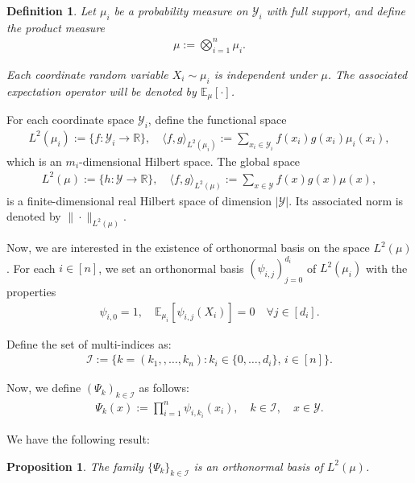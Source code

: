 \documentclass[letterpaper,11pt]{article}
\numberwithin{equation}{section}
\newtheorem{definition}[theorem]{Definition}
\newtheorem{proposition}[theorem]{Proposition}
\numberwithin{equation}{section}
\begin{document}
\begin{definition}
    Let $\mu_i$ be a probability measure on $\mathcal{Y}_i$ with full support, and define the product measure 
    \begin{align*}
        \mu:=\bigotimes_{i=1}^n \mu_i.
    \end{align*}

    Each coordinate random variable $X_i \sim \mu_i$ is independent under $\mu$. The associated expectation operator will be denoted by $\mathbb{E}_\mu[\cdot]$.
\end{definition}

For each coordinate space $\mathcal{Y}_i$, define the functional space 
\begin{align*}
    L^2(\mu_i):=\{f:\mathcal{Y}_i \to \mathbb{R}\},\quad \langle f,g \rangle_{L^2(\mu_i)}:=\sum_{x_i\in \mathcal{Y}_i} f(x_i)g(x_i)\mu_i(x_i),
\end{align*}
which is an $m_i$-dimensional Hilbert space. The global space 
\begin{align*}
    L^2(\mu):=\{h: \mathcal{Y}\to \mathbb{R}\},\quad \langle f,g \rangle_{L^2(\mu)}:=\sum_{x\in \mathcal{Y}} f(x)g(x)\mu(x), 
\end{align*}
is a finite-dimensional real Hilbert space of dimension $|\mathcal{Y}|$. Its associated norm is denoted by $\|\cdot\|_{L^2(\mu)}$.

Now, we are interested in the existence of orthonormal basis on the space $L^2(\mu)$. For each $i\in [n]$, we set an orthonormal basis $(\psi_{i,j})_{j=0}^{d_i}$ of $L^2(\mu_i)$ with the properties
\begin{align*}
    \psi_{i,0}=1,\quad \mathbb{E}_{\mu_i} [\psi_{i,j} (X_i)]=0\quad \forall j\in [d_i].
\end{align*}

Define the set of multi-indices as:
\begin{align*}
    \mathcal{I}:=\{k=(k_1,,\ldots, k_n): k_i \in \{0,\ldots, d_i\},\, i\in [n]\}.
\end{align*}

Now, we define $(\Psi_k)_{k\in \mathcal{I}}$ as follows:
\begin{align}
    \label{def:orthonormal:basis}
    \Psi_k(x):=\prod_{i=1}^n \psi_{i,k_i}(x_i),\quad k\in \mathcal{I},\quad x\in \mathcal{Y}.
\end{align}

We have the following result:

\begin{proposition}
    The family $\{\Psi_k\}_{k\in \mathcal{I}}$ is an orthonormal basis of $L^2(\mu)$.
\end{proposition}
\end{document}
